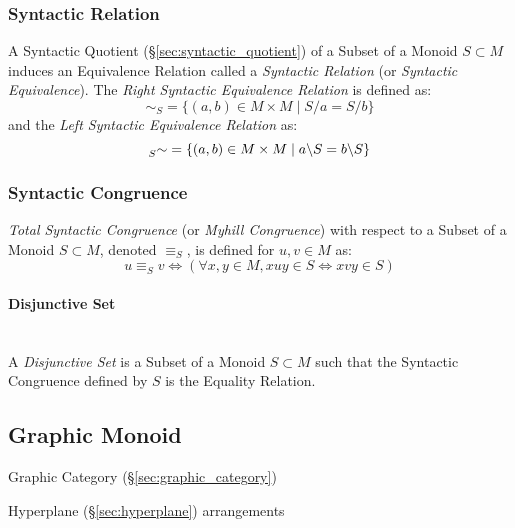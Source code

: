 \subsubsection{Syntactic Relation}\label{sec:syntactic_relation}

A Syntactic Quotient (\S\ref{sec:syntactic_quotient}) of a Subset of a
Monoid $S \subset M$ induces an Equivalence Relation called a
\emph{Syntactic Relation} (or \emph{Syntactic Equivalence}). The
\emph{Right Syntactic Equivalence Relation} is defined as:
\[
  \sim_S = \{ (a,b) \in M \times M \;|\; S/a = S/b\}
\]
and the \emph{Left Syntactic Equivalence Relation} as:
\[
  \prescript{}{S}{\sim} = \{ (a,b) \in M \times M \;|\;
  a \backslash S = b \backslash S \}
\]



\subsubsection{Syntactic Congruence}\label{sec:syntactic_congruence}

\emph{Total Syntactic Congruence} (or \emph{Myhill Congruence}) with
respect to a Subset of a Monoid $S \subset M$, denoted $\equiv_S$, is
defined for $u,v \in M$ as:
\[
  u \equiv_S v \Leftrightarrow
  (\forall x,y \in M, xuy \in S \Leftrightarrow xvy \in S)
\]



\paragraph{Disjunctive Set}\label{sec:disjunctive_set}\hfill \\

A \emph{Disjunctive Set} is a Subset of a Monoid $S \subset M$ such
that the Syntactic Congruence defined by $S$ is the Equality Relation.



\subsection{Graphic Monoid}\label{sec:graphic_monoid}


Graphic Category (\S\ref{sec:graphic_category})

Hyperplane (\S\ref{sec:hyperplane}) arrangements



